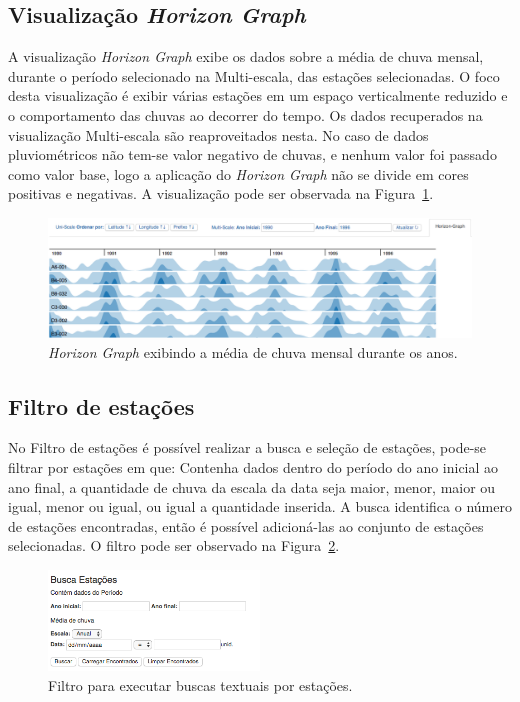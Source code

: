 \documentclass[article,11pt,oneside,a4paper]{abntex2} %
\begin{document}
	\subsection{Visualização \textit{Horizon Graph}}
		\hspace{13pt}
	A visualização \textit{Horizon Graph} exibe os dados sobre a média de chuva mensal, durante o período selecionado na Multi-escala, das estações selecionadas. O foco desta visualização é exibir várias estações em um espaço verticalmente reduzido e o comportamento das chuvas ao decorrer do tempo. Os dados recuperados na visualização Multi-escala são reaproveitados nesta. No caso de dados pluviométricos não tem-se valor negativo de chuvas, e nenhum valor foi passado como valor base, logo a aplicação do \textit{Horizon Graph} não se divide em cores positivas e negativas. A visualização pode ser observada na Figura~\ref{my_horizon}.
	\begin{figure}[!htb]
		\centering
		\includegraphics[width=1\textwidth]{figuras/my_horizon1}
		\caption{\textit{Horizon Graph} exibindo a média de chuva mensal durante os anos.}
		\label{my_horizon}
	\end{figure}
	
	\subsection{Filtro de estações}
		\hspace{13pt}
	No Filtro de estações é possível realizar a busca e seleção de estações, pode-se filtrar por estações em que: Contenha dados dentro do período do ano inicial ao ano final, a quantidade de chuva da escala da data seja maior, menor, maior ou igual, menor ou igual, ou igual a quantidade inserida. A busca identifica o número de estações encontradas, então é possível adicioná-las ao conjunto de estações selecionadas. O filtro pode ser observado na Figura~\ref{filtro}.
	
	\begin{figure}[!htb]
		\centering
		\includegraphics[width=0.5\textwidth]{figuras/filtro}
		\caption{Filtro para executar buscas textuais por estações.}
		\label{filtro}
	\end{figure}
	
\end{document}
